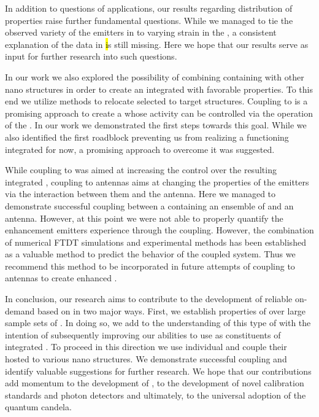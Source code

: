    In addition to questions of applications, our results regarding distribution of \siv properties raise further fundamental questions. While we managed to tie the observed variety of the emitters in \vl to varying strain in the \nds, a consistent explanation of the data in \hl is still missing. Here we hope that our results serve as input for further research into such questions.

   In our work we also explored the possibility of combining \nds containing \sivs with other nano structures in order to create an integrated \sps with favorable properties. To this end we utilize \pp methods to relocate selected \nds to target structures. Coupling \nds to \VCSELs is a promising approach to create a \sps whose activity can be controlled via the operation of the \VCSELs. In our work we demonstrated the first steps towards this goal. While we also identified the first roadblock preventing us from realizing a functioning integrated \sps for now, a promising approach to overcome it was suggested.

   While coupling to \VCSELs was aimed at increasing the control over the resulting integrated \sps, coupling to antennas aims at changing the properties of the emitters via the interaction between them and the antenna. Here we managed to demonstrate successful coupling between a \nd containing an ensemble of \sivs and an antenna. However, at this point we were not able to properly quantify the enhancement emitters experience through the coupling. However, the combination of numerical FTDT simulations and experimental methods has been established as a valuable method to predict the behavior of the coupled system. Thus we recommend this method to be incorporated in future attempts of coupling \sivs to antennas to create enhanced \sps.

   In conclusion, our research aims to contribute to the development of reliable on-demand \sps based on \sivs in two major ways. First, we establish properties of \sivs over large sample sets of \nds. In doing so, we add to the understanding of this type of \cc with the intention of subsequently improving our abilities to use \sivs as constituents of integrated \sps. To proceed in this direction we use individual \nds and couple their hosted \sivs to various nano structures. We demonstrate successful coupling and identify valuable suggestions for further research.
   We hope that our contributions add momentum to the development of \sps, to the development of novel calibration standards and photon detectors and ultimately, to the universal adoption of the quantum candela.
